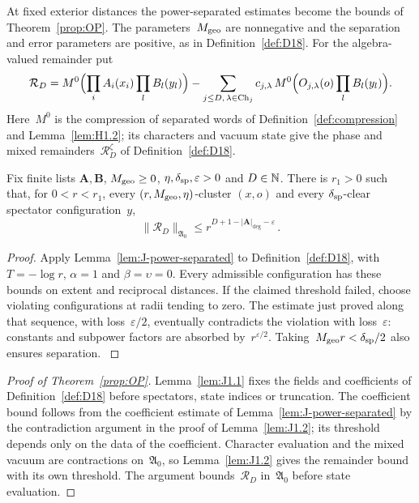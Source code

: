 At fixed exterior distances the power-separated estimates become the bounds of Theorem~\ref{prop:OP}. The parameters~$M_{\rm geo}$ are nonnegative and the separation and error parameters are positive, as in Definition~\ref{def:D18}. For the algebra-valued remainder put
\begin{equation*}
\mathcal R_D=M^0\Bigl(\prod_i A_i(x_i)\prod_l B_l(y_l)\Bigr)
-\sum_{j\le D,\,\lambda\in\mathrm{Ch}_{j}}c_{j,\lambda}\,
 M^0\Bigl(O_{j,\lambda}(o)\prod_l B_l(y_l)\Bigr).
\end{equation*}
Here~$M^0$ is the compression of separated words of Definition~\ref{def:compression} and Lemma~\ref{lem:H1.2}; its characters and vacuum state give the phase and mixed remainders~$\mathcal R_D^\zeta$ of Definition~\ref{def:D18}.

\begin{lemma}\label{lem:J1.2}
Fix finite lists $\boldsymbol A,\boldsymbol B$, $M_{\rm geo}\ge0$, $\eta,\delta_{\rm sp},\varepsilon>0$ and $D\in\mathbb{N}$. There is $r_1>0$ such that, for $0<r<r_1$, every $(r,M_{\rm geo},\eta)$-cluster $(x,o)$ and every $\delta_{\rm sp}$-clear spectator configuration~$y$,
\begin{equation*}
\|\mathcal R_D\|_{\mathfrak A_0}\le r^{D+1-|\boldsymbol A|_{\deg}-\varepsilon}\,.
\end{equation*}
\end{lemma}

\begin{proof}\label{proof:J1.2-start}
Apply Lemma~\ref{lem:J-power-separated} to Definition~\ref{def:D18}, with $T=-\log r$, $\alpha=1$ and $\beta=\upsilon=0$. Every admissible configuration has these bounds on extent and reciprocal distances. If the claimed threshold failed, choose violating configurations at radii tending to zero. The estimate just proved along that sequence, with loss~$\varepsilon/2$, eventually contradicts the violation with loss~$\varepsilon$: constants and subpower factors are absorbed by~$r^{\varepsilon/2}$. Taking~$M_{\rm geo}r<\delta_{\rm sp}/2$ also ensures separation.
\label{proof:J1.2-end}
\end{proof}

\begin{proof}[Proof of Theorem~\ref{prop:OP}]
Lemma~\ref{lem:J1.1} fixes the fields and coefficients of Definition~\ref{def:D18} before spectators, state indices or truncation. The coefficient bound follows from the coefficient estimate of Lemma~\ref{lem:J-power-separated} by the contradiction argument in the proof of Lemma~\ref{lem:J1.2}; its threshold depends only on the data of the coefficient. Character evaluation and the mixed vacuum are contractions on~$\mathfrak A_0$, so Lemma~\ref{lem:J1.2} gives the remainder bound with its own threshold. The argument bounds~$\mathcal R_D$ in~$\mathfrak A_0$ before state evaluation.
\end{proof}

